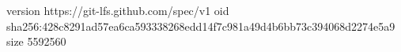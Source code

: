 version https://git-lfs.github.com/spec/v1
oid sha256:428c8291ad57ea6ca593338268edd14f7c981a49d4b6bb73c394068d2274e5a9
size 5592560
